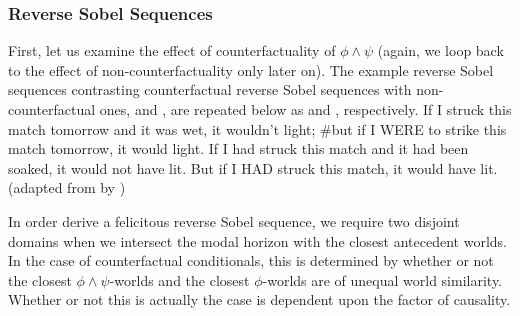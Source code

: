 \subsubsection{Reverse Sobel Sequences}
First, let us examine the effect of counterfactuality of $\phi\land\psi$ (again, we loop back to the effect of non-counterfactuality only later on). The example reverse Sobel sequences contrasting counterfactual reverse Sobel sequences with non-counterfactual ones,  and , are repeated below as  and , respectively.
\ex{}
    If I struck this match tomorrow and it was wet, it wouldn't light; \#but if I \MakeUppercase{were} to strike this match tomorrow, it would light.
\xe
\ex{}If I had struck this match and it had been soaked, it would not have lit. But if I \MakeUppercase{had} struck this match, it would have lit.\\%
\emptyfill(adapted from \textcite[p.~106]{Stalnaker1968} by \textcite[p.~487]{Lewis2018})
\xe

In order derive a felicitous reverse Sobel sequence, we require two disjoint domains when we intersect the modal horizon with the closest antecedent worlds. In the case of counterfactual conditionals, this is determined by whether or not the closest $\phi\land\psi$-worlds and the closest $\phi$-worlds are of unequal world similarity. Whether or not this is actually the case is dependent upon the factor of causality.

